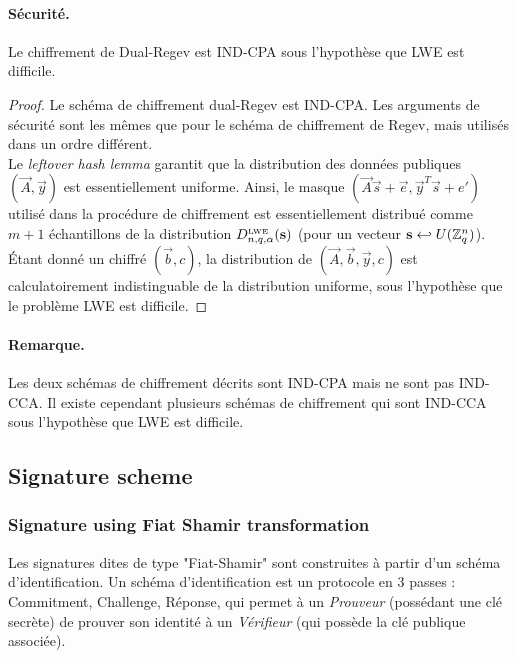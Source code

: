 \medskip





\paragraph{Sécurité.} 

\begin{theorem}
Le chiffrement de Dual-Regev est IND-CPA sous l'hypothèse que LWE est difficile. 
\end{theorem}

\begin{proof}
Le schéma de chiffrement dual-Regev est IND-CPA. 
Les arguments de sécurité sont les mêmes que pour le schéma de chiffrement de Regev, mais utilisés dans un ordre différent.\\
Le \emph{leftover hash lemma} garantit que la distribution des données publiques $(\vec{A},\vec{y})$ est essentiellement uniforme.
Ainsi, le masque $(\vec{A}\vec{s}+\vec{e},\vec{y}^T \vec{s} + e')$ utilisé dans la procédure de chiffrement 
est essentiellement distribué comme $m+1$ échantillons de la distribution $D_{n,q,\alpha}^{\mbox{\tiny LWE}}(\vec{s})$ (pour un vecteur $\vec{s} \hookleftarrow U(\mZ_q^n)$).\\
\'Etant donné un chiffré $(\vec{b},c)$, la  distribution de  $(\vec{A},\vec{b},\vec{y},c)$ est calculatoirement indistinguable de la distribution uniforme, sous 
l'hypothèse que le problème LWE est difficile.
\end{proof}

\paragraph{Remarque.} Les deux schémas de chiffrement décrits sont IND-CPA mais ne sont pas IND-CCA. Il existe cependant plusieurs schémas de chiffrement qui sont IND-CCA sous l'hypothèse que LWE est difficile.

\subsection{Signature scheme}



\subsubsection{Signature using Fiat Shamir transformation}

Les signatures dites de type "Fiat-Shamir" sont construites à partir d'un schéma d'identification. Un schéma d'identification est un protocole en 3 passes : Commitment, Challenge, Réponse, qui permet à un \emph{Prouveur} (possédant une clé secrète) de prouver son identité à un \emph{Vérifieur} (qui possède la clé publique associée).

